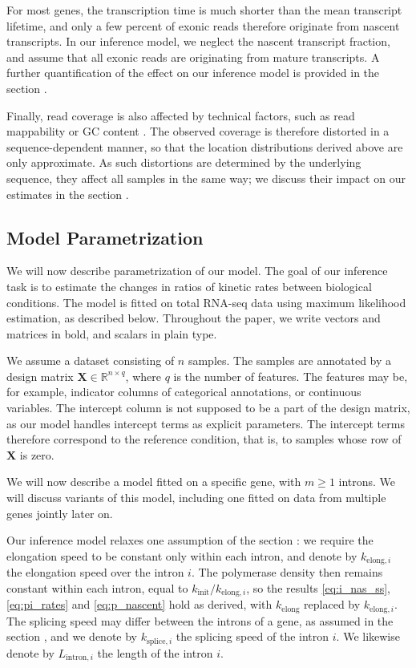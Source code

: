 \documentclass[11pt]{article}
\begin{document}
	For most genes, the transcription time is much shorter than the mean transcript lifetime, and only a few percent of exonic reads therefore originate from nascent transcripts. In our inference model, we neglect the nascent transcript fraction, and assume that all exonic reads are originating from mature transcripts. A further quantification of the effect on our inference model is provided in the section .
	
	Finally, read coverage is also affected by technical factors, such as read mappability or GC content \citep{derrienFastComputationApplications2012, loveModelingRNAseqFragment2016}. The observed coverage is therefore distorted in a sequence-dependent manner, so that the location distributions derived above are only approximate. As such distortions are determined by the underlying sequence, they affect all samples in the same way; we discuss their impact on our estimates in the section .
	
	\subsection{Model Parametrization} \label{subsec:model_param}	
	We will now describe parametrization of our model. The goal of our inference task is to estimate the changes in ratios of kinetic rates between biological conditions. The model is fitted on total RNA-seq data using maximum likelihood estimation, as described below. Throughout the paper, we write vectors and matrices in bold, and scalars in plain type.
	
	We assume a dataset consisting of $n$ samples. The samples are annotated by a design matrix $\boldsymbol{X} \in \mathbb{R}^{n \times q}$, where $q$ is the number of features. The features may be, for example, indicator columns of categorical annotations, or continuous variables. The intercept column is not supposed to be a part of the design matrix, as our model handles intercept terms as explicit parameters. The intercept terms therefore correspond to the reference condition, that is, to samples whose row of $\boldsymbol{X}$ is zero.

	We will now describe a model fitted on a specific gene, with $m \geq 1$ introns. We will discuss variants of this model, including one fitted on data from multiple genes jointly later on.

	Our inference model relaxes one assumption of the section : we require the elongation speed to be constant only within each intron, and denote by $k_{\mathrm{elong},i}$ the elongation speed over the intron $i$. The polymerase density then remains constant within each intron, equal to $k_{\mathrm{init}} / k_{\mathrm{elong},i}$, so the results \eqref{eq:i_nas_ss}, \eqref{eq:pi_rates} and \eqref{eq:p_nascent} hold as derived, with $k_{\mathrm{elong}}$ replaced by $k_{\mathrm{elong},i}$. The splicing speed may differ between the introns of a gene, as assumed in the section , and we denote by $k_{\mathrm{splice},i}$ the splicing speed of the intron $i$. We likewise denote by $L_{\mathrm{intron},i}$ the length of the intron $i$.
\end{document}
